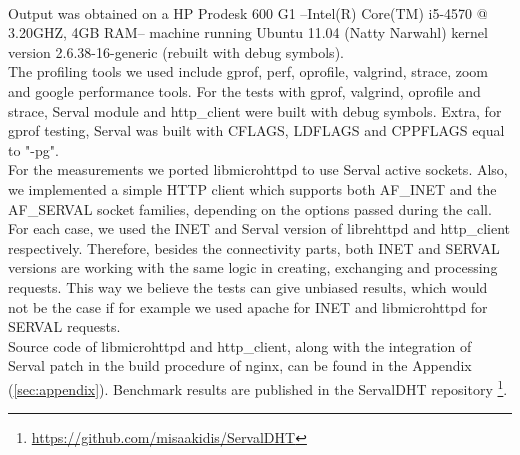 \paragraph{} Output was obtained on a HP Prodesk 600 G1 --Intel(R) Core(TM) i5-4570 @ 3.20GHZ, 4GB RAM-- machine running Ubuntu 11.04 (Natty Narwahl) kernel version 2.6.38-16-generic (rebuilt with debug symbols).
\\ \indent The profiling tools we used include gprof, perf, oprofile, valgrind, strace, zoom and google performance tools.
For the tests with gprof, valgrind, oprofile and strace, Serval module and http\_client were built with debug symbols.
Extra, for gprof testing, Serval was built with CFLAGS, LDFLAGS and CPPFLAGS equal to "-pg".
\\ \indent For the measurements we ported libmicrohttpd to use Serval active sockets.
Also, we implemented a simple HTTP client which supports both AF\_INET and the AF\_SERVAL socket families, depending on the options passed during the call.
For each case, we used the INET and Serval version of librehttpd and http\_client respectively.
Therefore, besides the connectivity parts, both INET and SERVAL versions are working with the same logic in creating, exchanging and processing requests.
This way we believe the tests can give unbiased results, which would not be the case if for example we used apache for INET and libmicrohttpd for SERVAL requests.
\\ \indent Source code of libmicrohttpd and http\_client, along with the integration of Serval patch in the build procedure of nginx, can be found in the Appendix (\ref{sec:appendix}).
Benchmark results are published in the ServalDHT repository \footnote{\url{https://github.com/misaakidis/ServalDHT}}.

